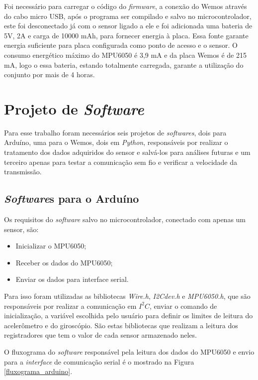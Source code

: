  Foi necessário para carregar o código do \textit{firmware}, a conexão do Wemos através do cabo micro USB, após o programa ser compilado e salvo no microcontrolador, este foi desconectado já com o sensor ligado a ele e foi adicionada uma bateria de 5V, 2A e carga de 10000 mAh, para fornecer energia à placa. Essa fonte garante  energia suficiente para placa configurada como ponto de acesso e o sensor. O consumo energético máximo do MPU6050 é 3,9 mA e da placa Wemos é de   215 mA, logo o essa bateria, estando totalmente carregada, garante a utilização do conjunto por mais de 4 horas.  
 
\section {Projeto de \textit{Software}}
		
		Para esse trabalho foram necessários seis projetos de \textit{softwares}, dois para Arduíno, uma para o Wemos,  dois em \textit{Python}, responsáveis por realizar o tratamento dos dados adquiridos do sensor e salvá-los para análises futuras e um terceiro apenas para testar a comunicação sem fio e verificar a velocidade da transmissão.
		
		\subsection{\textit{Software}s para o Arduíno}
			
			Os requisitos do \textit{software} salvo no microcontrolador, conectado com apenas um sensor, são:
			
			\begin{itemize}
				\item Inicializar o MPU6050;
				\item Receber os dados do MPU6050; 
				\item Enviar os dados para interface serial.
			\end{itemize}
		
		Para isso foram utilizadas as bibliotecas \textit{Wire.h}, \textit{I2Cdev.h} e \textit{MPU6050.h}, que são responsáveis por realizar a comunicação em $I^2C$, enviar o comando de inicialização, a variável escolhida pelo usuário para definir os limites de leitura do acelerômetro e do giroscópio. São estas bibliotecas que realizam a leitura dos registradores que tem o valor de cada sensor armazenado neles.  
		
		O fluxograma do \textit{software} responsável pela leitura dos dados do MPU6050 e envio para a \textit{interface} de comunicação serial é o mostrado na Figura \ref{fluxograma_arduino}. 
		
